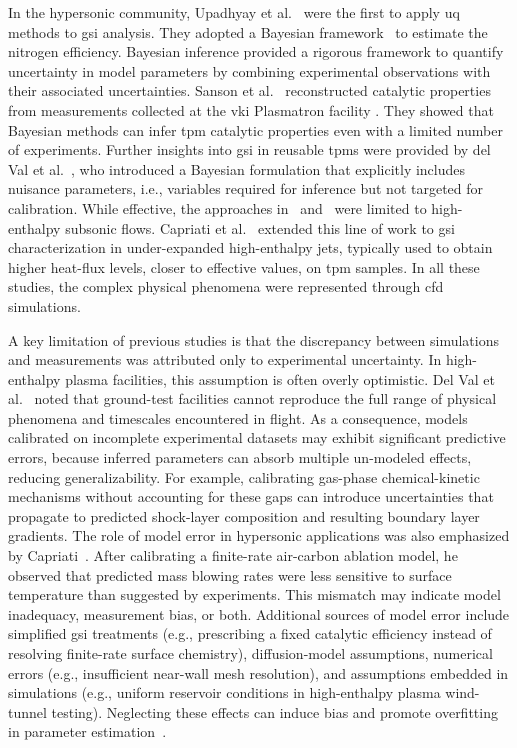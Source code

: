 \smallskip
In the hypersonic community, Upadhyay et al.~\cite{Upadhyay_2011} were the first to apply \gls{uq} methods to \gls{gsi} analysis. They adopted a Bayesian framework~\cite{kaipio2005,uq_theory} to estimate the nitrogen efficiency. Bayesian inference provided a rigorous framework to quantify uncertainty in model parameters by combining experimental observations with their associated uncertainties. Sanson et al.~\cite{SANSON2018482} reconstructed catalytic properties from measurements collected at the \gls{vki} Plasmatron facility \cite{Plasmatron, el2024upgraded}. They showed that Bayesian methods can infer \gls{tpm} catalytic properties even with a limited number of experiments. Further insights into \gls{gsi} in reusable \glspl{tpm} were provided by del Val et al.~\cite{DelVal_2022}, who introduced a Bayesian formulation that explicitly includes nuisance parameters, i.e., variables required for inference but not targeted for calibration. While effective, the approaches in~\cite{SANSON2018482} and~\cite{DelVal_2022} were limited to high-enthalpy subsonic flows. Capriati et al.~\cite{Capriati2024} extended this line of work to \gls{gsi} characterization in under-expanded high-enthalpy jets, typically used to obtain higher heat-flux levels, closer to effective values, on \gls{tpm} samples. In all these studies, the complex physical phenomena were represented through \gls{cfd} simulations.

\smallskip
A key limitation of previous studies is that the discrepancy between simulations and measurements was attributed only to experimental uncertainty. In high-enthalpy plasma facilities, this assumption is often overly optimistic. Del Val et al.~\cite{del2026modelerror} noted that ground-test facilities cannot reproduce the full range of physical phenomena and timescales encountered in flight. As a consequence, models calibrated on incomplete experimental datasets may exhibit significant predictive errors, because inferred parameters can absorb multiple un-modeled effects, reducing generalizability. For example, calibrating gas-phase chemical-kinetic mechanisms without accounting for these gaps can introduce uncertainties that propagate to predicted shock-layer composition and resulting boundary layer gradients. The role of model error in hypersonic applications was also emphasized by Capriati~\cite{PhDThesis_Capriati}. After calibrating a finite-rate air-carbon ablation model, he observed that predicted mass blowing rates were less sensitive to surface temperature than suggested by experiments. This mismatch may indicate model inadequacy, measurement bias, or both. Additional sources of model error include simplified \gls{gsi} treatments (e.g., prescribing a fixed catalytic efficiency instead of resolving finite-rate surface chemistry), diffusion-model assumptions, numerical errors (e.g., insufficient near-wall mesh resolution), and assumptions embedded in simulations (e.g., uniform reservoir conditions in high-enthalpy plasma wind-tunnel testing). Neglecting these effects can induce bias and promote overfitting in parameter estimation~\cite{hagan_2014, ling2014selection}.

